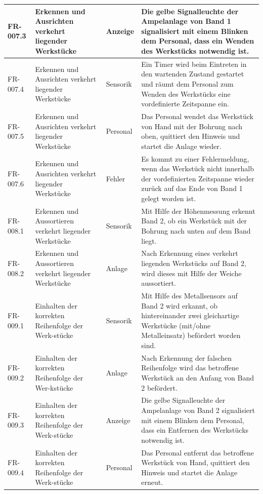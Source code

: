 \documentclass[oneside,a4paper,titlepage]{scrartcl} %
\begin{document}
\begin{small}
\begin{longtable}{|p{2cm}|p{4cm}|p{1.5cm}|p{5.5cm}|}
  \hline
  FR-007.3 & Erkennen und Ausrichten verkehrt liegender Werkstücke & Anzeige & Die gelbe Signalleuchte der Ampelanlage von Band 1 signalisiert mit einem Blinken dem Personal, dass ein Wenden des Werkstücks notwendig ist.\\
  \hline    
  FR-007.4 & Erkennen und Ausrichten verkehrt liegender Werkstücke & Sensorik & Ein Timer wird beim Eintreten in den wartenden Zustand gestartet und räumt dem Personal zum Wenden des Werkstücks eine vordefinierte Zeitspanne ein.\\
  \hline    
  FR-007.5 & Erkennen und Ausrichten verkehrt liegender Werkstücke & Personal & Das Personal wendet das Werkstück von Hand mit der Bohrung nach oben, quittiert den Hinweis und startet die Anlage wieder.\\
  \hline    
  FR-007.6 & Erkennen und Ausrichten verkehrt liegender Werkstücke & Fehler & Es kommt zu einer Fehlermeldung, wenn das Werkstück nicht innerhalb der vordefinierten Zeitspanne wieder zurück auf das Ende von Band 1 gelegt worden ist.\\
  \hline
  \rowcolor{gray} FR-008.1 & Erkennen und Aussortieren verkehrt liegender Werkstücke & Sensorik & Mit Hilfe der Höhenmessung erkennt Band 2, ob ein Werkstück mit der Bohrung nach unten auf dem Band liegt.\\
  \hline    
  \rowcolor{gray} FR-008.2 & Erkennen und Aussortieren verkehrt liegender Werkstücke & Anlage & Nach Erkennung eines verkehrt liegenden Werkstücks auf Band 2, wird dieses mit Hilfe der Weiche aussortiert.\\
  \hline
  FR-009.1 & Einhalten der korrekten Reihenfolge der Werk-stücke & Sensorik & Mit Hilfe des Metallsensors auf Band 2 wird erkannt, ob hintereinander zwei gleichartige Werkstücke (mit/ohne Metalleinsatz) befördert worden sind.\\
  \hline    
  FR-009.2 & Einhalten der korrekten Reihenfolge der Wer-kstücke & Anlage & Nach Erkennung der falschen Reihenfolge wird das betroffene Werkstück an den Anfang von Band 2 befördert.\\
  \hline
  FR-009.3 & Einhalten der korrekten Reihenfolge der Werk-stücke & Anzeige & Die gelbe Signalleuchte der Ampelanlage von Band 2 signalisiert mit einem Blinken dem Personal, dass ein Entfernen des Werkstücks notwendig ist.\\
  \hline
  FR-009.4 & Einhalten der korrekten Reihenfolge der Werk-stücke & Personal & Das Personal entfernt das betroffene Werkstück von Hand, quittiert den Hinweis und startet die Anlage erneut.\\

\end{longtable}
\end{small}
\end{document}
